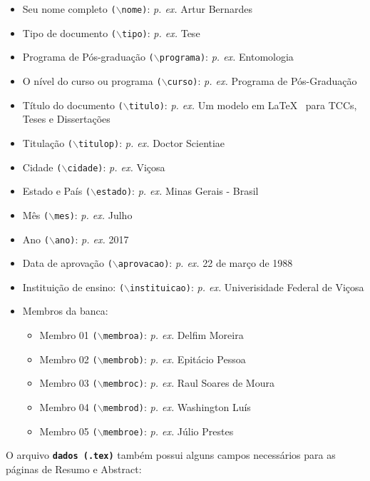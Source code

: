 \documentclass{article}
\begin{document}
\begin{itemize}
 \item Seu nome completo \texttt{($\backslash$nome)}: \textit{p. ex.} Artur Bernardes
 \item Tipo de documento \texttt{($\backslash$tipo)}: \textit{p. ex.} Tese
 \item Programa de Pós-graduação \texttt{($\backslash$programa)}: \textit{p. ex.} Entomologia
 \item O nível do curso ou programa \texttt{($\backslash$curso)}: \textit{p. ex.} Programa de Pós-Graduação
 \item Título do documento \texttt{($\backslash$titulo)}: \textit{p. ex.} Um modelo em \LaTeX~ para TCCs, Teses e Dissertações
 \item Titulação \texttt{($\backslash$titulop)}: \textit{p. ex.} Doctor Scientiae
 \item Cidade \texttt{($\backslash$cidade)}: \textit{p. ex.} Viçosa
 \item Estado e País \texttt{($\backslash$estado)}: \textit{p. ex.} Minas Gerais - Brasil
 \item Mês \texttt{($\backslash$mes)}: \textit{p. ex.} Julho
 \item Ano \texttt{($\backslash$ano)}: \textit{p. ex.} 2017
 \item Data de aprovação \texttt{($\backslash$aprovacao)}: \textit{p. ex.} 22 de março de 1988
 \item Instituição de ensino: \texttt{($\backslash$instituicao)}: \textit{p. ex.} Univerisidade Federal de Viçosa
 \item Membros da banca:
 \begin{itemize}
  \item Membro 01 \texttt{($\backslash$membroa)}: \textit{p. ex.} Delfim Moreira
    \item Membro 02 \texttt{($\backslash$membrob)}: \textit{p. ex.} Epitácio Pessoa
      \item Membro 03 \texttt{($\backslash$membroc)}: \textit{p. ex.} Raul Soares de Moura
        \item Membro 04 \texttt{($\backslash$membrod)}: \textit{p. ex.} Washington Luís
          \item Membro 05 \texttt{($\backslash$membroe)}: \textit{p. ex.} Júlio Prestes
 \end{itemize}
\end{itemize}

 O arquivo \texttt{\textbf{dados (.tex)}} também possui alguns campos necessários para as páginas de Resumo e Abstract:
 
\end{document}
